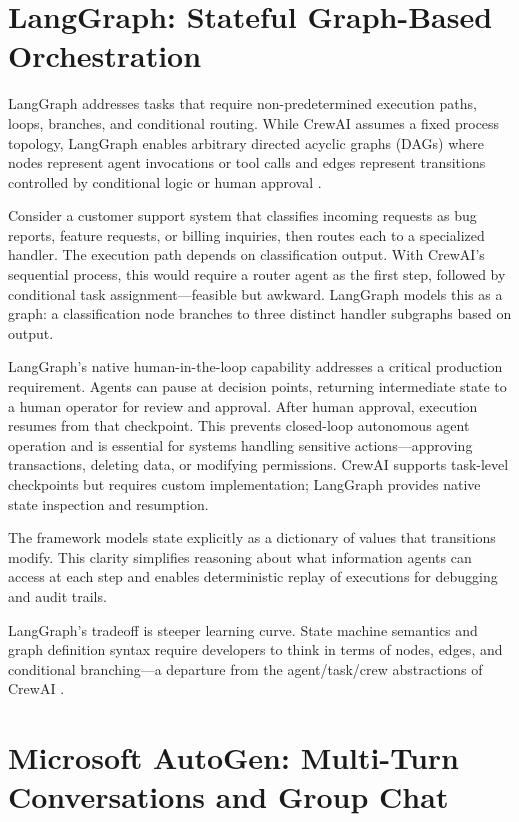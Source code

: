 \section{LangGraph: Stateful Graph-Based Orchestration}

LangGraph addresses tasks that require non-predetermined execution paths, loops, branches, and conditional routing. While CrewAI assumes a fixed process topology, LangGraph enables arbitrary directed acyclic graphs (DAGs) where nodes represent agent invocations or tool calls and edges represent transitions controlled by conditional logic or human approval \cite{Segal2026}.

Consider a customer support system that classifies incoming requests as bug reports, feature requests, or billing inquiries, then routes each to a specialized handler. The execution path depends on classification output. With CrewAI's sequential process, this would require a router agent as the first step, followed by conditional task assignment---feasible but awkward. LangGraph models this as a graph: a classification node branches to three distinct handler subgraphs based on output.

LangGraph's native human-in-the-loop capability addresses a critical production requirement. Agents can pause at decision points, returning intermediate state to a human operator for review and approval. After human approval, execution resumes from that checkpoint. This prevents closed-loop autonomous agent operation and is essential for systems handling sensitive actions---approving transactions, deleting data, or modifying permissions. CrewAI supports task-level checkpoints but requires custom implementation; LangGraph provides native state inspection and resumption.

The framework models state explicitly as a dictionary of values that transitions modify. This clarity simplifies reasoning about what information agents can access at each step and enables deterministic replay of executions for debugging and audit trails.

LangGraph's tradeoff is steeper learning curve. State machine semantics and graph definition syntax require developers to think in terms of nodes, edges, and conditional branching---a departure from the agent/task/crew abstractions of CrewAI \cite{Segal2026}.

\section{Microsoft AutoGen: Multi-Turn Conversations and Group Chat}

